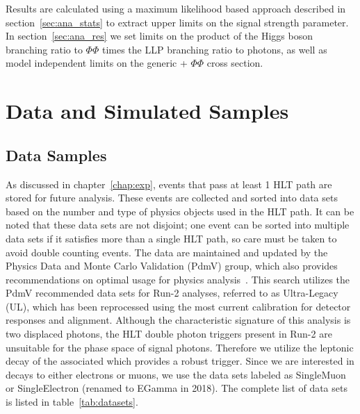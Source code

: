 Results are calculated using a maximum likelihood based approach described in section~\ref{sec:ana_stats} to extract upper limits on the signal strength parameter. In section~\ref{sec:ana_res} we set limits on the product of the Higgs boson branching ratio to $\Phi\Phi$ times the LLP branching ratio to photons, as well as model independent limits on the generic \PZ + $\Phi\Phi$ cross section.

\section{Data and Simulated Samples} \label{sec:ana_samples}

\subsection{Data Samples} \label{sec:ana_data}
As discussed in chapter~\ref{chap:exp}, events that pass at least 1 HLT path are stored for future analysis. These events are collected and sorted into data sets based on the number and type of physics objects used in the HLT path. It can be noted that these data sets are not disjoint; one event can be sorted into multiple data sets if it satisfies more than a single HLT path, so care must be taken to avoid double counting events. The data are maintained and updated by the Physics Data and Monte Carlo Validation (PdmV) group, which also provides recommendations on optimal usage for physics analysis~\cite{pdmv}. This search utilizes the PdmV recommended data sets for Run-2 analyses, referred to as Ultra-Legacy (UL), which has been reprocessed using the most current calibration for detector responses and alignment. Although the characteristic signature of this analysis is two displaced photons, the HLT double photon triggers present in Run-2 are unsuitable for the phase space of signal photons. Therefore we utilize the leptonic decay of the associated \PZ which provides a robust trigger. Since we are interested in \PZ decays to either electrons or muons, we use the data sets labeled as SingleMuon or SingleElectron (renamed to EGamma in 2018). The complete list of data sets is listed in table~\ref{tab:datasets}.

